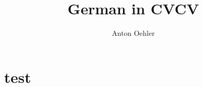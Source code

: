 \documentclass[
]{scrartcl}
\title{German in CVCV}
\author{Anton Oehler}
\begin{document}
\maketitle

\begin{abstract}

\end{abstract}

\section{test}
 
\begin{structure}
    \wordstart
    \vowel{\textschwa}
    \fen

\end{structure}

\begin{structure}
    \wordstart
    \emptyNucleus
    \vowel[floating]{\textschwa}
    \fen

\end{structure}
\end{document}
